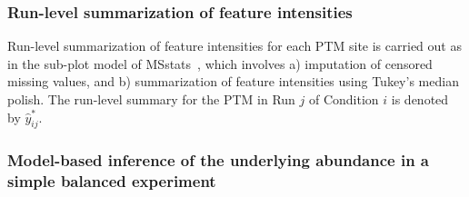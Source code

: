 \documentclass{mcp}
\begin{document}



\subsubsection{Run-level summarization of feature intensities}
\label{sec:sum}

Run-level summarization of feature intensities for each PTM site is carried out as in the sub-plot model of MSstats~\cite{choi_etal_14a}, which involves a) imputation of censored missing values, and b) summarization of feature intensities using Tukey's median polish. \cite{tukey_77a} The run-level summary for the PTM in Run $j$ of Condition $i$ is denoted by $\hat{y}_{ij}^{\ast}$.


\subsubsection{Model-based inference of the underlying abundance in a simple balanced experiment}
\label{sec:infer}
\end{document}
